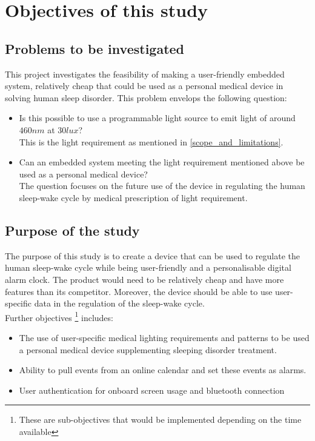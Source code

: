 \section{Objectives of this study}

\subsection{Problems to be investigated}
This project investigates the feasibility of making a user-friendly embedded system, relatively cheap that could be used as a personal medical device in solving human sleep disorder. This problem envelops the following question:
\begin{itemize}
\item[1] Is this possible to use a programmable light source to emit light of around $460nm$ at $30 lux$?\\
This is the light requirement as mentioned in \cref{scope_and_limitations}.
\item[2] Can an embedded system meeting the light requirement mentioned above be used as a personal medical device?\\
The question focuses on the future use of the device in regulating the human sleep-wake cycle by medical prescription of light requirement.
\end{itemize}

\subsection{Purpose of the study}\label{purpose_of_the_study}
The purpose of this study is to create a device that can be used to regulate the human sleep-wake cycle while being user-friendly and a personalisable digital alarm clock. The product would need to be relatively cheap and have more features than its competitor. Moreover, the device should be able to use user-specific data in the regulation of the sleep-wake cycle.\\
Further objectives \footnote{These are sub-objectives that would be implemented depending on the time available} includes:
\begin{itemize}
\item The use of user-specific medical lighting requirements and patterns to be used a personal medical device supplementing sleeping disorder treatment.
\item Ability to pull events from an online calendar and set these events as alarms.
\item User authentication for onboard screen usage and bluetooth connection  
\end{itemize} 


